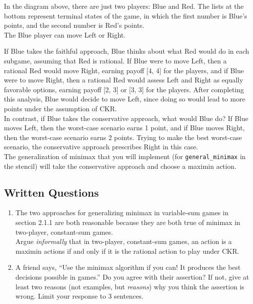 \documentclass{article}
\begin{document}
In the diagram above, there are just two players: Blue and Red.
The lists at the bottom represent terminal states of the game, in which the first number is Blue's points, and the second number is Red's points. ~\\

The Blue player can move Left or Right. 

If Blue takes the faithful approach, Blue thinks about what Red would do in each subgame, assuming that Red is rational.
If Blue were to move Left, then a rational Red would move Right, earning payoff [4, 4] for the players, and if Blue were to move Right, then a rational Red would assess Left and Right as equally favorable options, earning payoff [2, 3] or [3, 3] for the players.
After completing this analysis, Blue would decide to move Left, since doing so would lead to more points under the assumption of CKR. ~\\

In contrast, if Blue takes the conservative approach, what would Blue do?
If Blue moves Left, then the worst-case scenario earns 1 point, and if Blue moves Right, then the worst-case scenario earns 2 points.
Trying to make the best worst-case scenario, the conservative approach prescribes Right in this case. ~\\

The generalization of minimax that you will implement (for \verb|general_minimax| in the stencil) will take the conservative approach and choose a maximin action.

\subsection{Written Questions}
\begin{enumerate}
    \item The two approaches for generalizing minimax in variable-sum games in section 2.1.1 are both reasonable because they are both true of minimax in two-player, constant-sum games. ~\\
    Argue \textit{informally} that in two-player, constant-sum games, an action is a maximin actions if and only if it is the rational action to play under CKR.
    
    \item A friend says, ``Use the minimax algorithm if you can! It produces the best decisions possible in games.''
    Do you agree with their assertion?
    If not, give at least two reasons (not examples, but \textit{reasons}) why you think the assertion is wrong.
    Limit your response to 3 sentences.
    
\end{enumerate}
\end{document}
